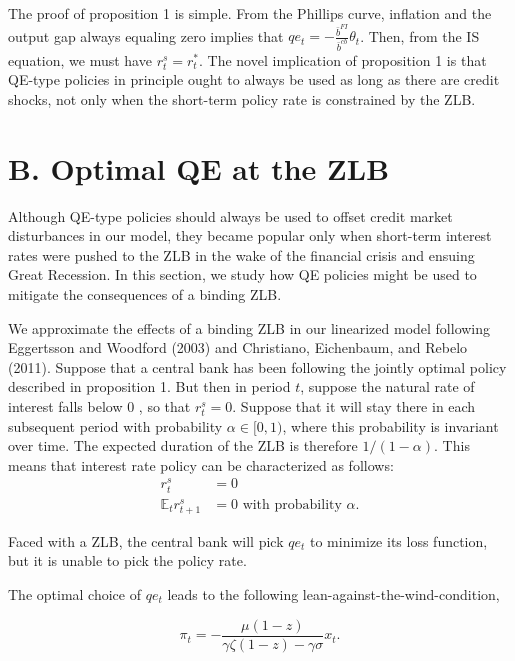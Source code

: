\documentclass[10pt]{article}
\begin{document}
The proof of proposition 1 is simple. From the Phillips curve, inflation and the output gap always equaling zero implies that $q e_{t}=-\frac{\bar{b}^{F I}}{\bar{b}^{c b}} \theta_{t}$. Then, from the IS equation, we must have $r_{t}^{s}=r_{t}^{*}$. The novel implication of proposition 1 is that QE-type policies in principle ought to always be used as long as there are credit shocks, not only when the short-term policy rate is constrained by the ZLB.

\section*{B. Optimal QE at the ZLB}
Although QE-type policies should always be used to offset credit market disturbances in our model, they became popular only when short-term interest rates were pushed to the ZLB in the wake of the financial crisis and ensuing Great Recession. In this section, we study how QE policies might be used to mitigate the consequences of a binding ZLB.

We approximate the effects of a binding ZLB in our linearized model following Eggertsson and Woodford (2003) and Christiano, Eichenbaum, and Rebelo (2011). Suppose that a central bank has been following the jointly optimal policy described in proposition 1. But then in period $t$, suppose the natural rate of interest falls below 0 , so that $r_{t}^{s}=0$. Suppose that it will stay there in each subsequent period with probability $\alpha \in[0,1)$, where this probability is invariant over time. The expected duration of the ZLB is therefore $1 /(1-\alpha)$. This means that interest rate policy can be characterized as follows:\\
\begin{align*}
r_{t}^{s} & =0  \tag{41}\\
\mathbb{E}_{t} r_{t+1}^{s} & =0 \text { with probability } \alpha . \tag{42}
\end{align*}

Faced with a ZLB, the central bank will pick $q e_{t}$ to minimize its loss function, but it is unable to pick the policy rate.

The optimal choice of $q e_{t}$ leads to the following lean-against-the-wind-condition,

\begin{equation*}
\pi_{t}=-\frac{\mu(1-z)}{\gamma \zeta(1-z)-\gamma \sigma} x_{t} . \tag{43}
\end{equation*}
\end{document}
